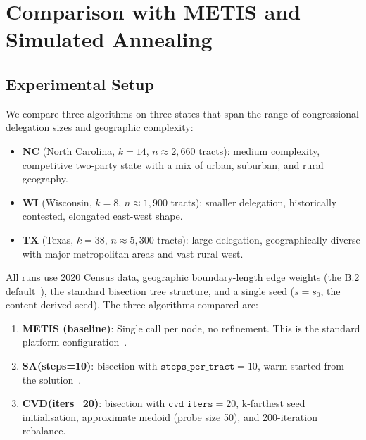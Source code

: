 \section{Comparison with METIS and Simulated Annealing}
\label{sec:comparison}

\subsection{Experimental Setup}

We compare three algorithms on three states that span the range of
congressional delegation sizes and geographic complexity:
\begin{itemize}
\item \textbf{NC} (North Carolina, $k=14$, $n \approx 2{,}660$ tracts):
  medium complexity, competitive two-party state with a mix of urban,
  suburban, and rural geography.
\item \textbf{WI} (Wisconsin, $k=8$, $n \approx 1{,}900$ tracts):
  smaller delegation, historically contested, elongated east-west shape.
\item \textbf{TX} (Texas, $k=38$, $n \approx 5{,}300$ tracts):
  large delegation, geographically diverse with major metropolitan areas
  and vast rural west.
\end{itemize}

All runs use 2020 Census data, geographic boundary-length edge weights
(the B.2 default~\citep{b2paper}), the standard bisection tree structure,
and a single seed ($s = s_0$, the content-derived seed).
The three algorithms compared are:

\begin{enumerate}
\item \textbf{METIS (baseline)}: Single \metis{} call per node, no refinement.
  This is the standard platform configuration~\citep{karypis1998}.
\item \textbf{SA(steps=10)}: \sa{} bisection with $\mathtt{steps\_per\_tract} = 10$,
  warm-started from the \metis{} solution~\citep{b19paper}.
\item \textbf{CVD(iters=20)}: \cvd{} bisection with
  $\mathtt{cvd\_iters} = 20$, k-farthest seed initialisation,
  approximate medoid (probe size 50), and 200-iteration rebalance.
\end{enumerate}

